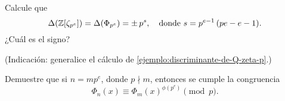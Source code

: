 \begin{ejercicio}
  Calcule que
  \[ \Delta (\mathbb{Z} [\zeta_{p^e}]) = \Delta (\Phi_{p^e}) = \pm\,p^s,
     \quad \text{donde } s = p^{e-1}\,(pe - e - 1). \]
  ¿Cuál es el signo?

  \noindent(Indicación: generalice el cálculo de
  \ref{ejemplo:discriminante-de-Q-zeta-p}.)
\end{ejercicio}

\begin{ejercicio}
  Demuestre que si $n = m p^e$, donde $p \nmid m$, entonces se cumple
  la congruencia
  $$\Phi_n (x) \equiv \Phi_m (x)^{\phi (p^e)} \pmod{p}.$$
\end{ejercicio}
